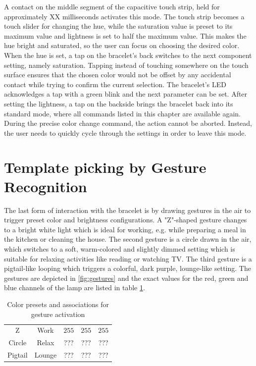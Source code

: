 A contact on the middle segment of the capacitive touch strip, held for approximately XX milliseconds activates this mode. The touch strip becomes a touch slider for changing the hue, while the saturation value is preset to its maximum value and lightness is set to half the maximum value. This makes the hue bright and saturated, so the user can focus on choosing the desired color. When the hue is set, a tap on the bracelet's back switches to the next component setting, namely saturation. Tapping instead of touching somewhere on the touch surface ensures that the chosen color would not be offset by any accidental contact while trying to confirm the current selection. The bracelet's \ac{LED} acknowledges a tap with a green blink and the next parameter can be set. After setting the lightness, a tap on the backside brings the bracelet back into its standard mode, where all commands listed in this chapter are available again. During the precise color change command, the action cannot be aborted. Instead, the user needs to quickly cycle through the settings in order to leave this mode.

\section{Template picking by Gesture Recognition}
The last form of interaction with the bracelet is by drawing gestures in the air to trigger preset color and brightness configurations. A "Z"-shaped gesture changes to a bright white light which is ideal for working, e.g. while preparing a meal in the kitchen or cleaning the house. The second gesture is a circle drawn in the air, which switches to a soft, warm-colored and slightly dimmed setting which is suitable for relaxing activities like reading or watching TV. The third gesture is a pigtail-like looping which triggers a colorful, dark purple, lounge-like setting. The gestures are depicted in \ref{fig:gestures} and the exact values for the red, green and blue channels of the lamp are listed in table \ref{tab:colors}.

\begin{table}
	\myfloatalign
	\begin{tabularx}{.8\textwidth}{ccccc}
		\toprule
		\tableheadline{Gesture} & \tableheadline{Association} & \tableheadline{Red} & \tableheadline{Green} & \tableheadline{Blue}\\ 
		\midrule
		Z & Work & $ 255 $ & $ 255 $ & $ 255 $\\
		Circle & Relax & ??? & ??? & ???\\
		Pigtail & Lounge & ??? & ??? & ???\\
		\bottomrule
	\end{tabularx}
	\caption[Color presets for gesture activation]{Color presets and associations for gesture activation}  \label{tab:colors}
\end{table}

